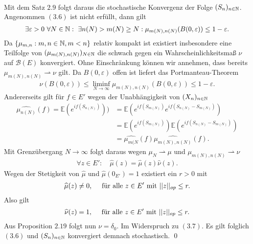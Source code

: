 \begin{proof*}
\begin{align}
    \end{align}
    Mit dem Satz $2.9$ folgt daraus die stochastische Konvergenz der Folge $(S_n)_{n \in \mathbb{N}}$. Angenommen $(3.6)$ ist nicht erfüllt, dann gilt
    \begin{align*}
        \exists \varepsilon > 0 \ \forall N \in \mathbb{N}: \ \exists n(N) > m(N) \geq N: \mu_{m(N), n(N)}(B(0, \varepsilon)) \leq 1 - \varepsilon.
    \end{align*}
    Da $\{\mu_{m,n}: m,n \in \mathbb{N}, m < n \}$ relativ kompakt ist existiert insbesondere eine Teilfolge von $(\mu_{m(N),n(N)})_{N \in \mathbb{N}}$ die schwach gegen ein Wahrscheinlichkeitsmaß $\nu$ auf $\mathcal{B}(E)$ konvergiert.
    Ohne Einschränkung können wir annehmen, dass bereits $\mu_{m(N),n(N)} \rightharpoonup \nu$ gilt. Da $B(0, \varepsilon)$ offen ist liefert das Portmanteau-Theorem
    \begin{align}
        \nu(B(0, \varepsilon)) \leq \liminf_{N \to \infty}\mu_{m(N),n(N)}(B(0,\varepsilon)) \leq 1 - \varepsilon. 
    \end{align}
    Andererseits gilt für $f \in E'$ wegen der Unabhängigkeit von $(X_n)_{n \in \mathbb{N}}$
    \begin{align*}
        \widehat{\mu_{n(N)}}(f) = \mathbb{E}(e^{if(S_{n(N)})})) &= \mathbb{E}(e^{if(S_{m(N)})}e^{if(S_{n(N)} - S_{m(N)})}) \\\
                                                   &= \mathbb{E}(e^{if(S_{m(N)})})\mathbb{E}(e^{if(S_{n(N)} - S_{m(N)})}) \\\
                                                   &= \widehat{\mu_{m(N}}(f)\widehat{\mu_{m(N),n(N)}}(f). 
    \end{align*}
    Mit Grenzübergang $N \to \infty$ folgt daraus wegen $\mu_N \rightharpoonup \mu$ und $\mu_{m(N),n(N)} \rightharpoonup \nu$
    \begin{align*}
        \forall z \in E': \quad \widehat{\mu}(z) = \widehat{\mu}(z) \widehat{\nu}(z).
    \end{align*}
    Wegen der Stetigkeit von $\widehat{\mu}$ und $\widehat{\mu}(0_{E'}) = 1$ existiert ein $r>0$ mit 
    \begin{align*}
        \widehat{\mu}(z) \neq 0, \quad \text{ für alle } z \in E' \text{ mit } \lvert\lvert z \rvert\rvert_{op} \leq r. 
    \end{align*}
    Also gilt 
    \begin{align*}
        \widehat{\nu}(z) = 1, \quad \text{ für alle } z \in E' \text{ mit } \lvert\lvert z \rvert\rvert_{op} \leq r. 
    \end{align*}
    Aus Proposition $2.19$ folgt nun $\nu = \delta_0$. Im Widerspruch zu $(3.7)$. Es gilt folglich $(3.6)$ und $(S_n)_{n \in \mathbb{N}}$ konvergiert demnach stochastisch. 
    \qed
\end{proof*}

